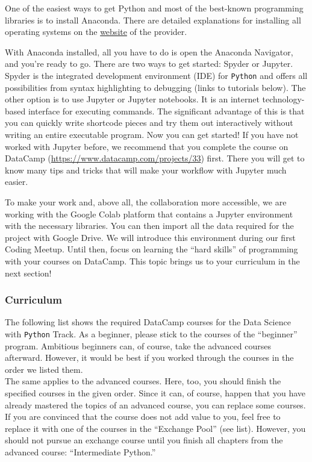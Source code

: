 \documentclass[
  11pt,
]{article}
\begin{document}
One of the easiest ways to get Python and most of the best-known programming libraries is to install Anaconda. There are detailed explanations for installing all operating systems on the \href{https://docs.anaconda.com/anaconda/install/}{website} of the provider.

With Anaconda installed, all you have to do is open the Anaconda Navigator, and you're ready to go. There are two ways to get started: Spyder or Jupyter. Spyder is the integrated development environment (IDE) for \texttt{Python} and offers all possibilities from syntax highlighting to debugging (links to tutorials below). The other option is to use Jupyter or Jupyter notebooks. It is an internet technology-based interface for executing commands. The significant advantage of this is that you can quickly write shortcode pieces and try them out interactively without writing an entire executable program.
Now you can get started! If you have not worked with Jupyter before, we recommend that you complete the course on DataCamp (\url{https://www.datacamp.com/projects/33}) first. There you will get to know many tips and tricks that will make your workflow with Jupyter much easier.

To make your work and, above all, the collaboration more accessible, we are working with the Google Colab platform that contains a Jupyter environment with the necessary libraries. You can then import all the data required for the project with Google Drive. We will introduce this environment during our first Coding Meetup. Until then, focus on learning the ``hard skills'' of programming with your courses on DataCamp. This topic brings us to your curriculum in the next section!

\hypertarget{curriculum-1}{%
\subsubsection{Curriculum}\label{curriculum-1}}

The following list shows the required DataCamp courses for the Data Science with \texttt{Python} Track. As a beginner, please stick to the courses of the ``beginner'' program. Ambitious beginners can, of course, take the advanced courses afterward. However, it would be best if you worked through the courses in the order we listed them.\\
The same applies to the advanced courses. Here, too, you should finish the specified courses in the given order. Since it can, of course, happen that you have already mastered the topics of an advanced course, you can replace some courses. If you are convinced that the course does not add value to you, feel free to replace it with one of the courses in the ``Exchange Pool'' (see list). However, you should not pursue an exchange course until you finish all chapters from the advanced course: ``Intermediate Python.''
\end{document}
